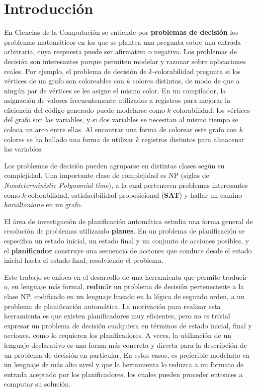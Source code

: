 
\chapter*{Introducción} %
\label{Intro}
En Ciencias de la Computación se entiende por \textbf{problemas de decisión}
los problemas matemáticos en los que se plantea una pregunta sobre una entrada
arbitraria, cuya respuesta puede ser afirmativa o negativa.
Los problemas de decisión son interesantes porque permiten modelar y razonar
sobre aplicaciones reales. Por ejemplo, el problema de decisión de
$k$-colorabilidad pregunta si los vértices de un grafo son coloreables 
con $k$ colores distintos, de modo de que a ningún par de vértices se les
asigne el mismo color. En un compilador, la asignación de valores
frecuentemente utilizados a registros para
mejorar la eficiencia del código generado puede modelarse como
$k$-colorabilidad: los vértices del grafo son las variables, y si dos variables
se necesitan al mismo tiempo se coloca un arco entre ellas. Al encontrar una
forma de colorear este grafo con $k$ colores se ha hallado una forma de
utilizar $k$ registros distintos para almacenar las variables.

Los problemas de decisión pueden agruparse en distintas clases según su
complejidad. Una importante clase de complejidad es NP (siglas de
\textit{Nondeterministic Polynomial time}), a la cual pertenecen problemas
interesantes como $k$-colorabilidad, satisfacibilidad proposicional
(\textbf{SAT}) y hallar un camino \textit{hamiltoniano} en un grafo.

El área de investigación de planificación automática estudia una forma general
de resolución de problemas utilizando \textbf{planes}. En un problema de planificación
se especifica un estado inicial, un estado final y un conjunto de acciones posibles,
y el \textbf{planificador} construye una secuencia de acciones que conduce
desde el estado inicial hasta el estado final, resolviendo el problema.


Este trabajo se enfoca en el desarrollo de una herramienta que permite
traducir o, en lenguaje más formal, \textbf{reducir} un problema de
decisión perteneciente a la clase NP, codificado en un lenguaje
basado en la lógica de segundo orden, a un problema de
planificación automática. La motivación para realizar esta herramienta es que
existen planificadores muy eficientes, pero no es trivial
expresar un problema de decisión cualquiera en términos de estado inicial,
final y acciones, como lo requieren los
planificadores. A veces, la utilización de un lenguaje declarativo es una forma
más concreta y directa para la descripción de un problema de decisión en
particular. En estos casos, es preferible modelarlo en un lenguaje de más alto
nivel y que la herramienta lo reduzca a un formato de entrada aceptado por
los planificadores, los cuales pueden proceder entonces a computar su solución.

